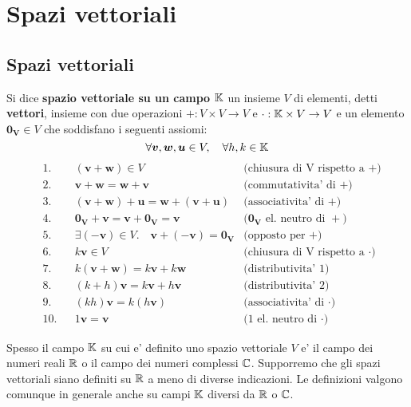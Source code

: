\chapter{Spazi vettoriali}

\section{Spazi vettoriali}
\begin{definition}
    Si dice \textbf{spazio vettoriale su un campo $\mathbb{K}$} un insieme $V$ di elementi, detti \textbf{vettori}, insieme con due operazioni $+ : V \times V \to V$ e $\cdot : \mathbb{K} \times V \to V$ e un elemento $\bm{0_V} \in V$ che soddisfano i seguenti assiomi:
    \[\forall \bm{v}, \bm{w}, \bm{u} \in V, \quad\forall h, k \in \mathbb{K} \]
    \begin{align}
        &\text{1.} &&(\bm{v} + \bm{w}) \in V                                        &\text{(chiusura di V rispetto a $+$)} \\      
        &\text{2.} &&\bm{v} + \bm{w} = \bm{w} + \bm{v}                              &\text{(commutativita' di $+$)} \\
        &\text{3.} &&(\bm{v} + \bm{w}) + \bm{u} = \bm{w} + (\bm{v} + \bm{u})        &\text{(associativita' di $+$)} \\
        &\text{4.} &&\bm{0_V} + \bm{v} = \bm{v} + \bm{0_V} = \bm{v}                 &\text{($\bm{0_V}$ el. neutro di $+$)} \\
        &\text{5.} &&\exists (-\bm{v}) \in V. \quad\bm{v} + (\bm{-v}) = \bm{0_V}    &\text{(opposto per $+$)} \\
        &\text{6.} &&k\bm{v} \in V                                                  &\text{(chiusura di V rispetto a $\cdot$)} \\
        &\text{7.} &&k(\bm{v} + \bm{w}) = k\bm{v} + k\bm{w}                         &\text{(distributivita' 1)} \\
        &\text{8.} &&(k + h)\bm{v}= k\bm{v} + h\bm{v}                               &\text{(distributivita' 2)} \\
        &\text{9.} &&(kh)\bm{v}= k(h\bm{v})                                         &\text{(associativita' di $\cdot$)} \\
        &\text{10.}&&1\bm{v}= \bm{v}                                                &\text{(1 el. neutro di $\cdot$)}
    \end{align}
\end{definition}
 
Spesso il campo $\mathbb{K}$ su cui e' definito uno spazio vettoriale $V$ e' il campo dei numeri reali $\mathbb{R}$ o il campo dei numeri complessi $\mathbb{C}$. Supporremo che gli spazi vettoriali siano definiti su $\mathbb{R}$ a meno di diverse indicazioni. Le definizioni valgono comunque in generale anche su campi $\mathbb{K}$ diversi da $\mathbb{R}$ o $\mathbb{C}$.

